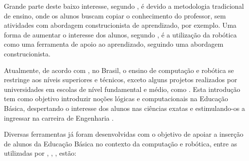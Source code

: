 Grande parte deste baixo interesse, segundo \cite{oQueEConstrutivismo}, é devido a metodologia tradicional de ensino, onde os alunos buscam copiar o conhecimento do professor, sem atividades com abordagem construcionista de aprendizado, por exemplo. Uma forma de aumentar o interesse dos alunos, segundo \cite{roboticaEducacionalAulasMatematica}, é a utilização da robótica como uma ferramenta de apoio ao aprendizado, seguindo uma abordagem construcionista.

Atualmente, de acordo com \cite{analiseFerramentaEnsinoComputacao}, no Brasil, o ensino de computação e robótica se restringe aos níveis superiores e técnicos, exceto alguns projetos realizados por universidades em escolas de nível fundamental e médio, como \cite{projetoRoboticaMauricio}. Esta introdução tem como objetivo introduzir noções lógicas e computacionais na Educação Básica, despertando o interesse dos alunos nas ciências exatas e estimulando-os a ingressar na carreira de Engenharia \cite{analiseFerramentaEnsinoComputacao}.

Diversas ferramentas já foram desenvolvidas com o objetivo de apoiar a inserção de alunos da Educação Básica no contexto da computação e robótica, entre as utilizadas por \cite{analiseFerramentaEnsinoComputacao}, \cite{projetoRoboticaMauricio}, \cite{simpleRobotsIntroductionEng}, estão:

